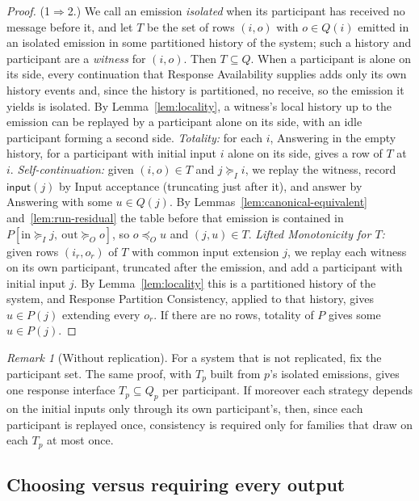 \documentclass[sigconf]{cidr-2027}
\theoremstyle{remark}
\newtheorem{remark}{Remark}
\newcommand{\OutputOrd}{\preceq_O}
\newcommand{\InputGe}{\succeq_I}
\newcommand{\OutputGe}{\succeq_O}
\newcommand{\indesc}{input extension\xspace} %
\newcommand{\outrelpart}{extending\xspace}    %
\newcommand{\fiber}[1]{P(#1)}
\begin{document}
\begin{proof}
\color{blue!70!black}(1$\Rightarrow$2.)  We call an emission \emph{isolated} when its participant has
received no message before it, and let $T$ be the set of rows $(i,o)$ with
$o\in Q(i)$ emitted in an isolated emission in some partitioned history of the
system; such a history and participant are a \emph{witness} for $(i,o)$.
Then $T\subseteq Q$.  When a participant is alone on its side, every
continuation that Response Availability supplies adds only its own history
events and, since the history is partitioned, no receive, so the emission it
yields is isolated.  By
Lemma~\ref{lem:locality}, a witness's local history up to the emission can be
replayed by a participant alone on its side, with an idle participant
forming a second side.
\emph{Totality:} for each $i$, Answering in the empty history, for a participant
with initial input $i$ alone on its side, gives a row of $T$ at $i$.
\emph{Self-continuation:} given $(i,o)\in T$ and $j\InputGe i$, we replay the
witness, record $\mathsf{input}(j)$ by Input acceptance (truncating just after
it), and answer by Answering with some $u\in Q(j)$.  By
Lemmas~\ref{lem:canonical-equivalent} and~\ref{lem:run-residual} the table
before that emission is contained in $P[\mathrm{in}\InputGe j,\
\mathrm{out}\OutputGe o]$, so $o\OutputOrd u$ and $(j,u)\in T$.
\emph{Lifted Monotonicity for $T$:} given rows $(i_r,o_r)$ of $T$ with common \indesc
$j$, we replay each witness on its own participant, truncated after the
emission, and add a participant with initial input $j$.  By
Lemma~\ref{lem:locality} this is a partitioned history of the system, and
Response Partition Consistency, applied to that history, gives $u\in\fiber{j}$
\outrelpart every $o_r$.  If there are no rows, totality of $P$ gives some
$u\in\fiber{j}$.\color{black}
\end{proof}

\begin{remark}[Without replication]
For a system that is not replicated, fix the participant set.  The same proof,
with $T_p$ built from $p$'s isolated emissions, gives one response interface
$T_p\subseteq Q_p$ per participant.  If moreover each strategy depends on the
initial inputs only through its own participant's, then, since each
participant is replayed once, consistency is required only for families that
draw on each $T_p$ at most once.
\end{remark}

\subsection{Choosing versus requiring every output}
\end{document}

